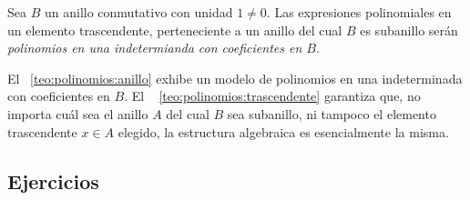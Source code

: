 \begin{defPolinomios}\label{def:polinomios:anillo}
	Sea $B$ un anillo conmutativo con unidad $1\neq 0$. Las
	expresiones polinomiales en un elemento trascendente,
	perteneciente a un anillo del cual $B$ es subanillo ser\'an
	\emph{polinomios en una indetermianda con coeficientes en $B$}.
\end{defPolinomios}

\begin{obsPolinomios}\label{obs:polinomios:anillo}
	El \teoname~\ref{teo:polinomios:anillo} exhibe un modelo de polinomios
	en una indeterminada con coeficientes en $B$. El \teoname~%
	\ref{teo:polinomios:trascendente} garantiza que,
	no importa cu\'al sea el anillo $A$ del cual $B$ sea subanillo, ni
	tampoco el elemento trascendente $x\in A$ elegido,
	la estructura algebraica es esencialmente la misma.
\end{obsPolinomios}

\subsection*{Ejercicios}



